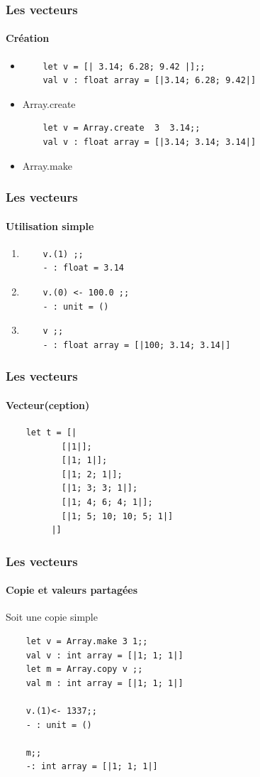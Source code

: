 \begin{frame}[fragile]
	\frametitle{Les vecteurs}
	\framesubtitle{Création}
	\begin{itemize}
	\item
	\begin{lstlisting}
	let v = [| 3.14; 6.28; 9.42 |];;
	val v : float array = [|3.14; 6.28; 9.42|]
	\end{lstlisting}

	\item Array.create
	\begin{lstlisting}
	let v = Array.create  3  3.14;;
	val v : float array = [|3.14; 3.14; 3.14|]
	\end{lstlisting}

	\item Array.make
	\end{itemize}
\end{frame}


\begin{frame}[fragile]
	\frametitle{Les vecteurs}
	\framesubtitle{Utilisation simple}
	\begin{enumerate}
	\item
	\begin{lstlisting}
	v.(1) ;;
	- : float = 3.14
	\end{lstlisting}

	\item
	\begin{lstlisting}
	v.(0) <- 100.0 ;;
	- : unit = ()
	\end{lstlisting}

	\item
	\begin{lstlisting}
	v ;;
	- : float array = [|100; 3.14; 3.14|]
	\end{lstlisting}
	\end{enumerate}
\end{frame}

\begin{frame}[fragile]
	\frametitle{Les vecteurs}
	\framesubtitle{Vecteur(ception)}
	\begin{lstlisting}
	let t = [| 
           [|1|];
           [|1; 1|];
           [|1; 2; 1|];
           [|1; 3; 3; 1|];
           [|1; 4; 6; 4; 1|];
           [|1; 5; 10; 10; 5; 1|]
         |] 
	\end{lstlisting}
\end{frame}

\begin{frame}[fragile]
	\frametitle{Les vecteurs}
	\framesubtitle{Copie et valeurs partagées}
	\begin{block}{Soit une copie simple}
	\begin{lstlisting}
	let v = Array.make 3 1;;
	val v : int array = [|1; 1; 1|]
	let m = Array.copy v ;;
	val m : int array = [|1; 1; 1|]

	v.(1)<- 1337;;
	- : unit = ()

	m;;
	-: int array = [|1; 1; 1|]
	\end{lstlisting}
	\end{block}
\end{frame}

